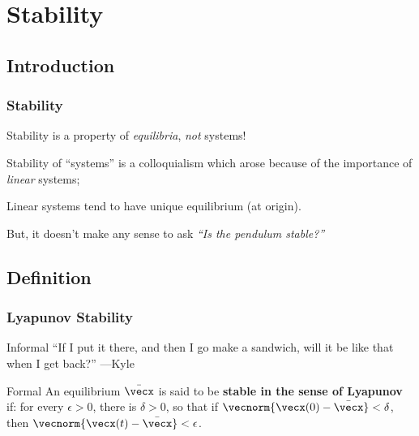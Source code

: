 \documentclass[12pt]{beamer}
\begin{document}
\section{Stability}

\subsection{Introduction}

\begin{frame}
\frametitle{Stability}

\begin{itemize}

\vitem Stability is a property of \emph{equilibria}, \emph{not} systems!

\vitem Stability of ``systems'' is a colloquialism which arose because of the importance of \emph{linear} systems;

\vitem Linear systems tend to have unique equilibrium (at origin).

\vitem But, it doesn't make any sense to ask \emph{``Is the pendulum stable?''}

\end{itemize}

\end{frame}



\subsection{Definition}

\begin{frame}
\frametitle{Lyapunov Stability}
\vfill
\begin{block}{Informal}
``If I put it there, and then I go make a sandwich, will it be like that when I get back?''
---Kyle
\end{block}

\vfill
\begin{block}{Formal}
An equilibrium $\bar\vecx$ is said to be \textbf{stable in the sense of Lyapunov} if:
for every $\epsilon > 0$, there is $\delta >0$, so that
if $\vecnorm{\vecx(0)-\bar\vecx} < \delta$, then
$\vecnorm{\vecx(t) - \bar\vecx} < \epsilon$. 
\end{block}

\vfill\null

\end{frame}
\end{document}
